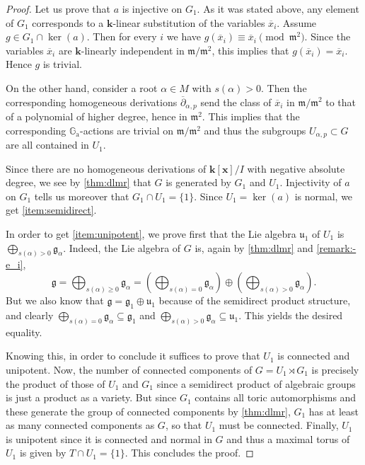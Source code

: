 \documentclass[11pt,letterpaper,reqno]{amsart}
\theoremstyle{remark}
\theoremstyle{definition}
\def\M{\mathfrak{m}}
\def\XX{\mathbf{x}}
\newcommand{\KK}[0]{\ensuremath{\mathbf{k}}}
\newcommand{\GA}[0]{\ensuremath{\mathbb{G}_{\mathrm{a}}}}
\begin{document}
\begin{proof}
Let us prove that $a$ is injective on $G_1$. As it was stated above, any element of $G_1$ corresponds to a $\KK$-linear substitution of the variables $\overline{x}_i$. Assume $g\in G_1\cap\ker(a).$ Then for every $i$ we have $g(\overline{x}_i)\equiv \overline{x}_i\pmod{\M^2}$. Since the variables $\overline{x}_i$ are $\KK$-linearly independent in $\M/\M^2$, this implies that $g(\overline{x}_i)=\overline{x}_i.$ Hence $g$ is trivial.

On the other hand, consider a root $\alpha\in M$ with $s(\alpha)>0$. Then the corresponding homogeneous derivations $\overline\partial_{\alpha,p}$ send the class of $\overline x_i$ in $\M/\M^2$ to that of a polynomial of higher degree, hence in $\M^2$. This implies that the corresponding $\GA$-actions are trivial on $\M/\M^2$ and thus the subgroups $U_{\alpha,p}\subset G$ are all contained in $U_1$.

Since there are no homogeneous derivations of $\KK[\XX]/I$ with negative absolute degree, we see by \cref{thm:dlmr} that $G$ is generated by $G_1$ and $U_1$. Injectivity of $a$ on $G_1$ tells us moreover that $G_1\cap U_1=\{1\}$. Since $U_1=\ker(a)$ is normal, we get \eqref{item:semidirect}.

In order to get \eqref{item:unipotent}, we prove first that the Lie algebra $\mathfrak u_1$ of $U_1$ is $\bigoplus_{s(\alpha)>0} \mathfrak g_\alpha$. Indeed, the Lie algebra of $G$ is, again by \cref{thm:dlmr} and \cref{remark:-e_i},
$$\mathfrak{g}=\bigoplus_{s(\alpha)\geq 0} \mathfrak g_\alpha=\left(\bigoplus_{s(\alpha)=0} \mathfrak g_\alpha\right)\oplus\left(\bigoplus_{s(\alpha)>0} \mathfrak g_\alpha\right).$$
But we also know that $\mathfrak{g}=\mathfrak g_1\oplus\mathfrak u_1$ because of the semidirect product structure, and clearly $\bigoplus_{s(\alpha)=0} \mathfrak g_\alpha\subseteq\mathfrak g_1$ and $\bigoplus_{s(\alpha)>0} \mathfrak g_\alpha\subseteq\mathfrak u_1$. This yields the desired equality.

Knowing this, in order to conclude it suffices to prove that $U_1$ is connected and unipotent. Now, the number of connected components of $G=U_1\rtimes G_1$ is precisely the product of those of $U_1$ and $G_1$ since a semidirect product of algebraic groups is just a product as a variety. But since $G_1$ contains all toric automorphisms and these generate the group of connected components by \cref{thm:dlmr}, $G_1$ has at least as many connected components as $G$, so that $U_1$ must be connected. Finally, $U_1$ is unipotent since it is connected and normal in $G$ and thus a maximal torus of $U_1$ is given by $T\cap U_1=\{1\}$. This concludes the proof.
\end{proof}
\end{document}
